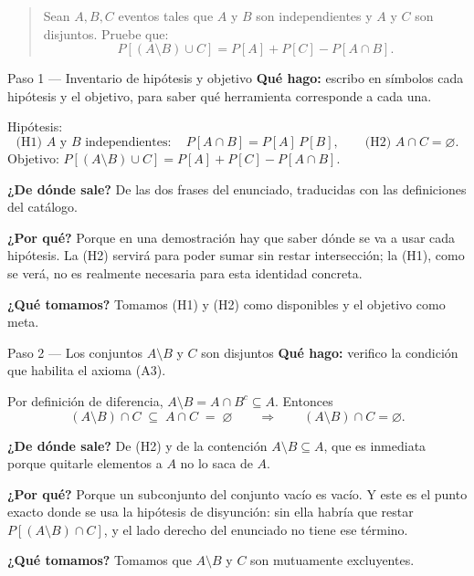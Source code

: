 \documentclass[11pt]{article}
\begin{document}
\begin{quote}
Sean $A,B,C$ eventos tales que $A$ y $B$ son independientes y $A$ y $C$ son disjuntos. Pruebe que:
\[
P[(A\setminus B)\cup C]=P[A]+P[C]-P[A\cap B].
\]
\end{quote}

\begin{sol}

\begin{paso}{Paso 1 --- Inventario de hip\'otesis y objetivo}
\textbf{Qu\'e hago:} escribo en s\'imbolos cada hip\'otesis y el objetivo, para saber qu\'e herramienta corresponde a cada una.

Hip\'otesis:
\[
\text{(H1) } A \text{ y } B \text{ independientes}: \quad P[A\cap B]=P[A]\,P[B],
\qquad
\text{(H2) } A\cap C=\varnothing .
\]
Objetivo: $P[(A\setminus B)\cup C]=P[A]+P[C]-P[A\cap B]$.

\textbf{¿De d\'onde sale?} De las dos frases del enunciado, traducidas con las definiciones del cat\'alogo.

\textbf{¿Por qu\'e?} Porque en una demostraci\'on hay que saber d\'onde se va a usar cada hip\'otesis. La (H2) servir\'a para poder sumar sin restar intersecci\'on; la (H1), como se ver\'a, no es realmente necesaria para esta identidad concreta.

\textbf{¿Qu\'e tomamos?} Tomamos (H1) y (H2) como disponibles y el objetivo como meta.
\end{paso}

\begin{paso}{Paso 2 --- Los conjuntos $A\setminus B$ y $C$ son disjuntos}
\textbf{Qu\'e hago:} verifico la condici\'on que habilita el axioma (A3).

Por definici\'on de diferencia, $A\setminus B=A\cap B^{c}\subseteq A$. Entonces
\[
(A\setminus B)\cap C\;\subseteq\; A\cap C\;=\;\varnothing
\qquad\Longrightarrow\qquad
(A\setminus B)\cap C=\varnothing .
\]

\textbf{¿De d\'onde sale?} De (H2) y de la contenci\'on $A\setminus B\subseteq A$, que es inmediata porque quitarle elementos a $A$ no lo saca de $A$.

\textbf{¿Por qu\'e?} Porque un subconjunto del conjunto vac\'io es vac\'io. Y este es el punto exacto donde se usa la hip\'otesis de disyunci\'on: sin ella habr\'ia que restar $P[(A\setminus B)\cap C]$, y el lado derecho del enunciado no tiene ese t\'ermino.

\textbf{¿Qu\'e tomamos?} Tomamos que $A\setminus B$ y $C$ son mutuamente excluyentes.
\end{paso}


\end{sol}
\end{document}
